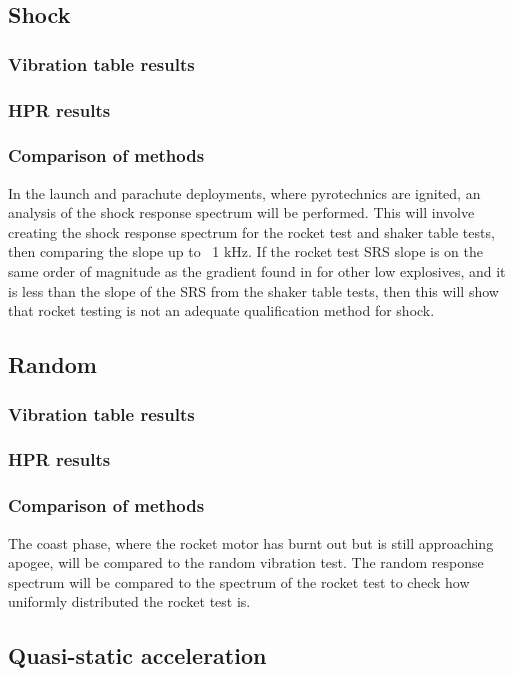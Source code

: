 \documentclass[a4paper,11pt]{article}
\begin{document}
\subsection{Shock}
\subsubsection{Vibration table results}
\subsubsection{HPR results}
\subsubsection{Comparison of methods}
In the launch and parachute deployments, where pyrotechnics are ignited, an analysis of the shock response spectrum will be performed. This will involve creating the shock response spectrum for the rocket test and shaker table tests, then comparing the slope up to ~1 kHz. If the rocket test SRS slope is on the same order of magnitude as the gradient found in \cite{wang2023numerical} for other low explosives, and it is less than the slope of the SRS from the shaker table tests, then this will show that rocket testing is not an adequate qualification method for shock.

\subsection{Random}
\subsubsection{Vibration table results}
\subsubsection{HPR results}
\subsubsection{Comparison of methods}
The coast phase, where the rocket motor has burnt out but is still approaching apogee, will be compared to the random vibration test. The random response spectrum will be compared to the spectrum of the rocket test to check how uniformly distributed the rocket test is.

\subsection{Quasi-static acceleration}
\end{document}
